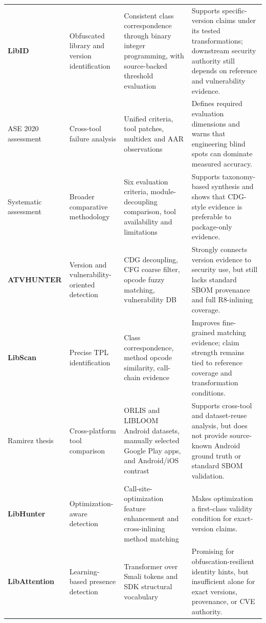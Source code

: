 \begin{longtable}{p{}p{}p{}p{}}
\textbf{LibID} \cite{zhang2019libid} &
Obfuscated library and version identification &
Consistent class correspondence through binary integer programming, with
source-backed threshold evaluation &
Supports specific-version claims under its tested transformations; downstream
security authority still depends on reference and vulnerability evidence.\\

ASE 2020 assessment \cite{zhan2020assessment} &
Cross-tool failure analysis &
Unified criteria, tool patches, multidex and AAR observations &
Defines required evaluation dimensions and warns that engineering blind spots
can dominate measured accuracy.\\

Systematic assessment \cite{zhan2021systematic} &
Broader comparative methodology &
Six evaluation criteria, module-decoupling comparison, tool availability and
limitations &
Supports taxonomy-based synthesis and shows that CDG-style evidence is
preferable to package-only evidence.\\

\textbf{ATVHUNTER} \cite{zhan2021atvhunter} &
Version and vulnerability-oriented detection &
CDG decoupling, CFG coarse filter, opcode fuzzy matching, vulnerability DB &
Strongly connects version evidence to security use, but still lacks standard
SBOM provenance and full R8-inlining coverage.\\

\textbf{LibScan} \cite{wu2023libscan} &
Precise TPL identification &
Class correspondence, method opcode similarity, call-chain evidence &
Improves fine-grained matching evidence; claim strength remains tied to
reference coverage and transformation conditions.\\

Ramirez thesis \cite{ramirez2024empirical} &
Cross-platform tool comparison &
ORLIS and LIBLOOM Android datasets, manually selected Google Play apps, and
Android/iOS contrast &
Supports cross-tool and dataset-reuse analysis, but does not provide
source-known Android ground truth or standard SBOM validation.\\

\textbf{LibHunter} \cite{xie2024libhunter} &
Optimization-aware detection &
Call-site-optimization feature enhancement and cross-inlining method matching &
Makes optimization a first-class validity condition for exact-version claims.\\

\textbf{LibAttention} \cite{pan2025libattention} &
Learning-based presence detection &
Transformer over Smali tokens and SDK structural vocabulary &
Promising for obfuscation-resilient identity hints, but insufficient alone
for exact versions, provenance, or CVE authority.\\


\end{longtable}
